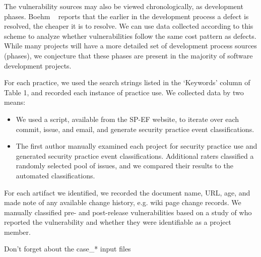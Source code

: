 The vulnerability sources may also be viewed chronologically, as development phases. Boehm ~\cite{boehm1981economics} reports that the earlier in the development process a defect is resolved, the cheaper it is to resolve. We can use data collected according to this scheme to analyze whether vulnerabilities follow the same cost pattern as defects.  While many projects will have a more detailed set of development process sources (phases), we conjecture that these phases are present in the majority of software development projects.


For each practice, we used the search strings listed in the ‘Keywords’ column of Table 1, and recorded each instance of practice use.  We collected data by two means:
\begin{itemize}
	\item We used a script, available from the SP-EF website, to iterate over each commit, issue, and email, and generate security practice event classifications.
	\item The first author manually examined each project for security practice use and generated security practice event classifications. Additional raters classified a randomly selected pool of issues, and we compared their results to the automated classifications.
\end{itemize}

For each artifact we identified, we recorded the document name, URL, age, and made note of any available change history, e.g. wiki page change records. We manually classified pre- and post-release vulnerabilities based on a study of who reported the vulnerability and whether they were identifiable as a project member.

Don't forget about the case_* input files



